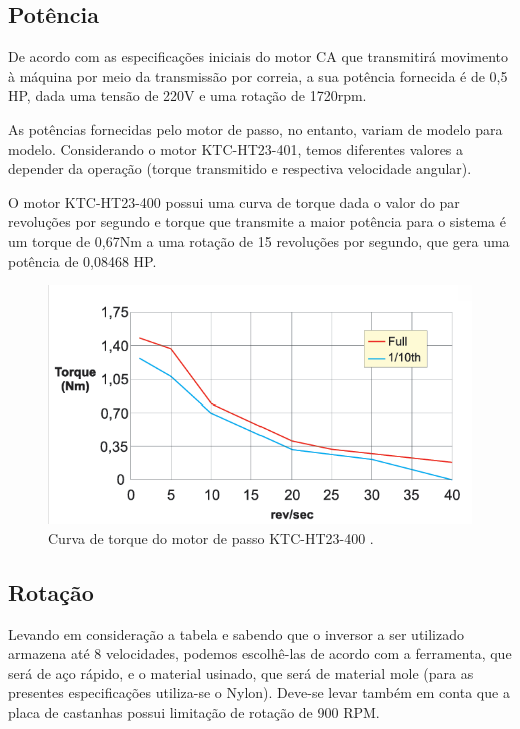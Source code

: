 \subsection{Potência}

De acordo com as especificações iniciais do motor CA que transmitirá movimento à máquina por meio da transmissão por correia, a sua potência fornecida é de 0,5 HP, dada uma tensão de 220V e uma rotação de 1720rpm.

As potências fornecidas pelo motor de passo, no entanto, variam de modelo para modelo. Considerando o motor KTC-HT23-401, temos diferentes valores a depender da operação (torque transmitido e respectiva velocidade angular). 

O motor KTC-HT23-400 possui uma curva de torque dada o valor do par revoluções por segundo e torque que transmite a maior potência para o sistema é um torque de 0,67Nm a uma rotação de 15 revoluções por segundo, que gera uma potência de 0,08468 HP.

\begin{figure}[h!]
    \centering
    \includegraphics[width=0.8\linewidth]{images/torque.png}
    \caption{Curva de torque do motor de passo KTC-HT23-400 \cite{kalatec2020catalogo}.}
    \label{fig:enter-label}
\end{figure}

\subsection{Rotação}

Levando em consideração a tabela e sabendo que o inversor a ser utilizado armazena até 8 velocidades, podemos escolhê-las de acordo com a ferramenta, que será de aço rápido, e o material usinado, que será de material mole (para as presentes especificações utiliza-se o Nylon). Deve-se levar também em conta que a placa de castanhas possui limitação de rotação de 900 RPM. 

